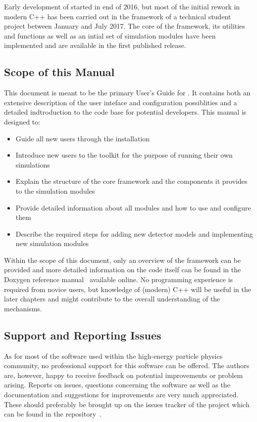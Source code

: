 Early development of \apsq started in end of 2016, but most of the initial rework in modern C++ has been carried out in the framework of a technical student project between January and July 2017.
The core of the framework, its utilities and functions as well as an intial set of simulation modules have been implemented and are available in the first published release.

\subsection{Scope of this Manual}
This document is meant to be the primary User's Guide for \apsq.
It contains both an extensive description of the user inteface and configuration possiblities and a detailed indtroduction to the code base for potential developers.
This manual is designed to:
\begin{itemize}
\item Guide all new users through the installation 
\item Introduce new users to the toolkit for the purpose of running their own simulations
\item Explain the structure of the core framework and the components it provides to the simulation modules
\item Provide detailed information about all modules and how to use and configure them
\item Describe the required steps for adding new detector models and implementing new simulation modules
\end{itemize}

Within the scope of this document, only an overview of the framework can be provided and more detailed information on the code itself can be found in the Doxygen reference manual~\cite{doxygen} available online.
No programming experience is required from novice users, but knowledge of (modern) C++ will be useful in the later chapters and might contribute to the overall understanding of the mechanisms.

\subsection{Support and Reporting Issues}
As for most of the software used within the high-energy particle physics community, no professional support for this software can be offered.
The authors are, however, happy to receive feedback on potential improvements or problem arising.
Reports on issues, questions concerning the software as well as the documentation and suggestions for improvements are very much appreciated.
These should preferably be brought up on the issues tracker of the project which can be found in the repository~\cite{ap2-issue-tracker}.


